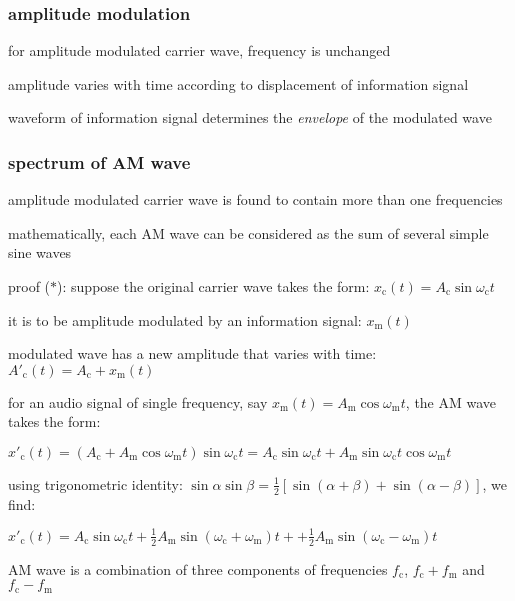 \subsubsection{amplitude modulation}

for amplitude modulated carrier wave, frequency is unchanged

amplitude varies with time according to displacement of information signal

waveform of information signal determines the \emph{envelope} of the modulated wave

\subsubsection*{spectrum of AM wave}

amplitude modulated carrier wave is found to contain more than one frequencies

mathematically, each AM wave can be considered as the sum of several simple sine waves

\noindent proof ($\ast$): suppose the original carrier wave takes the form: $x_\text{c}(t) = A_\text{c} \sin \omega_\text{c} t$

it is to be amplitude modulated by an information signal: $x_\text{m}(t)$

modulated wave has a new amplitude that varies with time: $A'_\text{c}(t) = A_\text{c} + x_\text{m}(t)$


for an audio signal of single frequency, say $x_\text{m}(t) = A_\text{m} \cos \omega_\text{m} t$, the AM wave takes the form:

{
	\centering
	
	$x'_\text{c}(t) = (A_\text{c} + A_\text{m} \cos \omega_\text{m} t)\sin \omega_\text{c} t = A_\text{c} \sin \omega_\text{c} t + A_\text{m} \sin \omega_\text{c} t \cos \omega_\text{m} t$
	
}

using trigonometric identity: $\sin\alpha\sin\beta = \frac{1}{2}\left[ \sin(\alpha + \beta) + \sin(\alpha - \beta) \right]$, we find:

{
	\centering
	
	$x'_\text{c}(t) = A_\text{c} \sin\omega_\text{c} t + \frac{1}{2}A_\text{m} \sin(\omega_\text{c}+\omega_\text{m})t + + \frac{1}{2}A_\text{m} \sin(\omega_\text{c}-\omega_\text{m})t$
	
}

AM wave is a combination of three components of frequencies $f_\text{c}$, $f_\text{c} + f_\text{m}$ and $f_\text{c} - f_\text{m}$ \eoe

